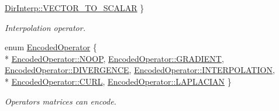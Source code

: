 \begin{DoxyCompactItemize}
\hyperlink{group__c02-enums_ga674ec67bd1baa04e5dc06c2bcc351972a6b389c8391a900c481d8c96c6045f468}{Dir\+Interp\+::\+V\+E\+C\+T\+O\+R\+\_\+\+T\+O\+\_\+\+S\+C\+A\+L\+A\+R}
 \}
\begin{DoxyCompactList}\small\item\em Interpolation operator. \end{DoxyCompactList}\item 
enum \hyperlink{group__c02-enums_ga9b50023bfb2692219d2915feade94f80}{Encoded\+Operator} \{ \\*
\hyperlink{group__c02-enums_ga9b50023bfb2692219d2915feade94f80a722d122e81cbbe543bd5520bb8678c0e}{Encoded\+Operator\+::\+N\+O\+O\+P}, 
\hyperlink{group__c02-enums_ga9b50023bfb2692219d2915feade94f80a90f70ea2675c36bd9b0b44a79f37a41f}{Encoded\+Operator\+::\+G\+R\+A\+D\+I\+E\+N\+T}, 
\hyperlink{group__c02-enums_ga9b50023bfb2692219d2915feade94f80a4e4e9e6d004c642e33d6f823b57bd60e}{Encoded\+Operator\+::\+D\+I\+V\+E\+R\+G\+E\+N\+C\+E}, 
\hyperlink{group__c02-enums_ga9b50023bfb2692219d2915feade94f80a6a9b19b26cdeae14c1102cd40345d568}{Encoded\+Operator\+::\+I\+N\+T\+E\+R\+P\+O\+L\+A\+T\+I\+O\+N}, 
\\*
\hyperlink{group__c02-enums_ga9b50023bfb2692219d2915feade94f80aa8bc924d0898064a538c557848f7ab48}{Encoded\+Operator\+::\+C\+U\+R\+L}, 
\hyperlink{group__c02-enums_ga9b50023bfb2692219d2915feade94f80a1c2d5f3f8e6cbb0c7b033c388c905d22}{Encoded\+Operator\+::\+L\+A\+P\+L\+A\+C\+I\+A\+N}
 \}
\begin{DoxyCompactList}\small\item\em Operators matrices can encode. \end{DoxyCompactList}\end{DoxyCompactItemize}
